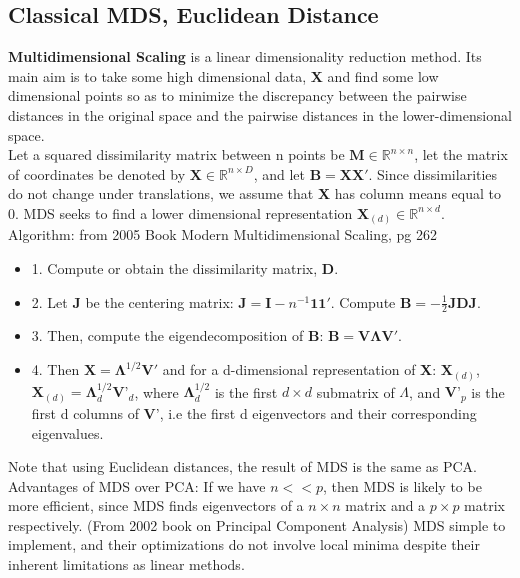 \documentclass[12pt]{report}
\begin{document}
\subsection{Classical MDS, Euclidean Distance}

\textbf{Multidimensional Scaling} is a linear dimensionality reduction method. 
Its main aim is to take some high dimensional data, \textbf{X} 
and find some low dimensional points so as to minimize the discrepancy 
between the pairwise distances in the original space and the pairwise distances 
in the lower-dimensional space. \\
Let a squared dissimilarity matrix between n points be 
$\textbf{M} \in \mathbb{R}^{n \times n}$, 
let the matrix of coordinates be denoted by 
$\textbf{X} \in \mathbb{R}^{n \times D}$, 
and let $\textbf{B} = \textbf{X}\textbf{X}'$. 
Since dissimilarities do not change under translations, 
we assume that \textbf{X} has column means equal to 0. 
MDS seeks to find a lower dimensional representation 
$\textbf{X}_{(d)} \in \mathbb{R}^{n \times d}$.\\
Algorithm: from 2005 Book Modern Multidimensional Scaling, pg 262
\begin{itemize}
    \item 1. Compute or obtain the dissimilarity matrix, \textbf{D}.
    \item 2. Let \textbf{J} be the centering matrix: $\textbf{J} = \textbf{I} - n^{-1}\mathbf{1}\mathbf{1}'$. Compute $\textbf{B} = -\frac{1}{2}\textbf{J}\textbf{D}\textbf{J}$.
    \item 3. Then, compute the eigendecomposition of \textbf{B}: $\textbf{B} = \textbf{V}\mathbf{\Lambda}\textbf{V}'$. 
    \item 4. Then $\textbf{X} = \mathbf{\Lambda}^{1/2}\textbf{V}'$ 
    and for a d-dimensional representation of 
    \textbf{X}: $\textbf{X}_{(d)}$, $\textbf{X}_{(d)} = \mathbf{\Lambda}^{1/2}_d\textbf{V'}_d$, 
    where $\mathbf{\Lambda}^{1/2}_d$ is the first $d \times d$ submatrix of $\Lambda$,
     and $\textbf{V'}_p$ is the first d columns of \textbf{V}', 
     i.e the first d eigenvectors and their corresponding eigenvalues.
\end{itemize}
Note that using Euclidean distances, the result of MDS is the same as PCA.
Advantages of MDS over PCA: If we have $n << p$, then MDS is likely to be more efficient, 
since MDS finds eigenvectors of a $n \times n$ matrix and a $p \times p$ matrix respectively. 
(From 2002 book on Principal Component Analysis)
MDS simple to implement, and their optimizations 
do not involve local minima despite their inherent limitations as linear methods.
\end{document}
